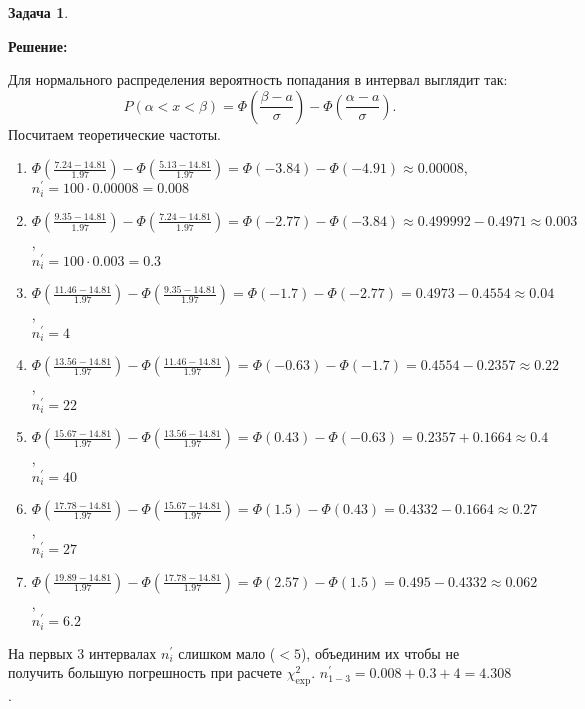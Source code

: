 \documentclass[a4paper,11pt]{article}
\newenvironment{shdd}{\begin{mdframed}[backgroundcolor=shadecolor]}{\end{mdframed}}
\theoremstyle{definition}
\newtheorem{problem}{Задача}\setlength{\parindent}{0pt}
\newenvironment{solution}
{\begin{shdd}
     \textbf{Решение:}\par\setlength{\parindent}{0pt}}
     {
\end{shdd}}
\begin{document}
\begin{problem}
\begin{solution}
            Для нормального распределения вероятность попадания в интервал выглядит так:
            \[
                P(\alpha < x < \beta) = \Phi(\frac{\beta - a}{\sigma}) - \Phi(\frac{\alpha - a}{\sigma}).
            \]
            Посчитаем теоретические частоты.
            \begin{enumerate}
                \item \(\Phi\left(\frac{7.24 - 14.81}{1.97}\right) - \Phi\left(\frac{5.13 - 14.81}{1.97}\right) = \Phi(-3.84) - \Phi(-4.91) \approx 0.00008 \), \\[1em]
                \(n_i^{'} = 100 \cdot 0.00008 = 0.008\)

                \item \(\Phi\left(\frac{9.35 - 14.81}{1.97}\right) - \Phi\left(\frac{7.24 - 14.81}{1.97}\right) = \Phi(-2.77) - \Phi(-3.84) \approx 0.499992 - 0.4971 \approx 0.003\), \\[1em]
                \(n_i^{'} = 100 \cdot 0.003 = 0.3\)

                \item \(\Phi\left(\frac{11.46 - 14.81}{1.97}\right) - \Phi\left(\frac{9.35 - 14.81}{1.97}\right) = \Phi(-1.7) - \Phi(-2.77) = 0.4973 - 0.4554 \approx 0.04\), \\[1em]
                \(n_i^{'} = 4\)

                \item \(\Phi\left(\frac{13.56 - 14.81}{1.97}\right) - \Phi\left(\frac{11.46 - 14.81}{1.97}\right) = \Phi(-0.63) - \Phi(-1.7) = 0.4554 - 0.2357 \approx 0.22\), \\[1em]
                \(n_i^{'} = 22\)

                \item \(\Phi\left(\frac{15.67 - 14.81}{1.97}\right) - \Phi\left(\frac{13.56 - 14.81}{1.97}\right) = \Phi(0.43) - \Phi(-0.63) = 0.2357 + 0.1664 \approx 0.4\), \\[1em]
                \(n_i^{'} = 40\)

                \item \(\Phi\left(\frac{17.78 - 14.81}{1.97}\right) - \Phi\left(\frac{15.67 - 14.81}{1.97}\right) = \Phi(1.5) - \Phi(0.43) = 0.4332 - 0.1664 \approx 0.27\), \\[1em]
                \(n_i^{'} = 27\)

                \item \(\Phi\left(\frac{19.89 - 14.81}{1.97}\right) - \Phi\left(\frac{17.78 - 14.81}{1.97}\right) = \Phi(2.57) - \Phi(1.5) = 0.495 - 0.4332 \approx 0.062\), \\[1em]
                \(n_i^{'} = 6.2 \)
            \end{enumerate}
            На первых 3 интервалах \(n_i^{'}\) слишком мало (\( < 5\)), объединим их чтобы не получить большую погрешность
            при расчете \(\chi^2_{\text{exp}}\). \(n_{1-3}^{'} = 0.008 + 0.3 + 4 = 4.308\).


\end{solution}
\end{problem}
\end{document}
